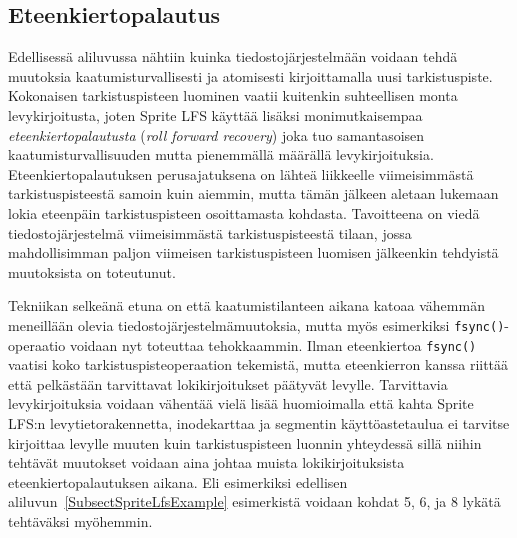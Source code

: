 \subsection{Eteenkiertopalautus}

Edellisessä aliluvussa nähtiin kuinka tiedostojärjestelmään voidaan tehdä muutoksia kaatumisturvallisesti ja atomisesti kirjoittamalla uusi tarkistuspiste.
Kokonaisen tarkistuspisteen luominen vaatii kuitenkin suhteellisen monta levykirjoitusta,
joten Sprite LFS käyttää lisäksi monimutkaisempaa \emph{eteenkiertopalautusta} (\emph{roll forward recovery}) joka tuo samantasoisen kaatumisturvallisuuden mutta pienemmällä määrällä levykirjoituksia.
Eteenkiertopalautuksen perusajatuksena on lähteä liikkeelle viimeisimmästä tarkistuspisteestä samoin kuin aiemmin,
mutta tämän jälkeen aletaan lukemaan lokia eteenpäin tarkistuspisteen osoittamasta kohdasta.
Tavoitteena on viedä tiedostojärjestelmä viimeisimmästä tarkistuspisteestä tilaan,
jossa mahdollisimman paljon viimeisen tarkistuspisteen luomisen jälkeenkin tehdyistä muutoksista on toteutunut.

Tekniikan selkeänä etuna on että kaatumistilanteen aikana katoaa vähemmän meneillään olevia tiedostojärjestelmämuutoksia,
mutta myös esimerkiksi \texttt{fsync()}-operaatio voidaan nyt toteuttaa tehokkaammin.
Ilman eteenkiertoa \texttt{fsync()} vaatisi koko tarkistuspisteoperaation tekemistä,
mutta eteenkierron kanssa riittää että pelkästään tarvittavat lokikirjoitukset päätyvät levylle.
Tarvittavia levykirjoituksia voidaan vähentää vielä lisää huomioimalla että kahta Sprite LFS:n levytietorakennetta,
inodekarttaa ja segmentin käyttöastetaulua ei tarvitse kirjoittaa levylle muuten kuin tarkistuspisteen luonnin yhteydessä
sillä niihin tehtävät muutokset voidaan aina johtaa muista lokikirjoituksista eteenkiertopalautuksen aikana.
Eli esimerkiksi edellisen aliluvun~\ref{SubsectSpriteLfsExample} esimerkistä voidaan kohdat 5, 6, ja 8 lykätä tehtäväksi myöhemmin.

